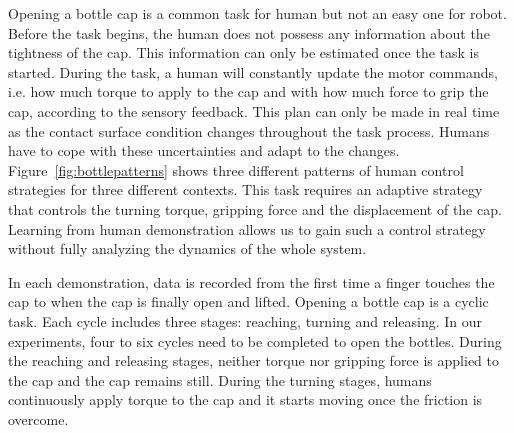 
Opening a bottle cap is a common task for human but not an easy one
for robot. Before the task begins, the human does not possess any
information about the tightness of the cap. This information can only
be estimated once the task is started. During the task, a human will
constantly update the motor commands, i.e. how much torque to apply to
the cap and with how much force to grip the cap, according to the
sensory feedback. This plan can only be made in real time as the
contact surface condition changes throughout the task process. Humans have
to cope with these uncertainties and adapt to the
changes. Figure~\ref{fig:bottlepatterns} shows three different
patterns of human control strategies for three different
contexts. This task requires an adaptive strategy that controls the
turning torque, gripping force and the displacement of the
cap. Learning from human demonstration allows us to gain such a
control strategy without fully analyzing the dynamics of the whole
system. %


In each demonstration, data is recorded from the first time a finger touches the cap
to when the cap is finally open and lifted. Opening a
bottle cap is a cyclic task. Each cycle includes three stages:
reaching, turning and releasing. In our experiments, four to six
cycles need to be completed to open the bottles. During the reaching
and releasing stages, neither torque nor gripping force is applied to the
cap and the cap remains still. During the turning stages, humans
continuously apply torque to the cap and it starts moving once the
friction is overcome.

